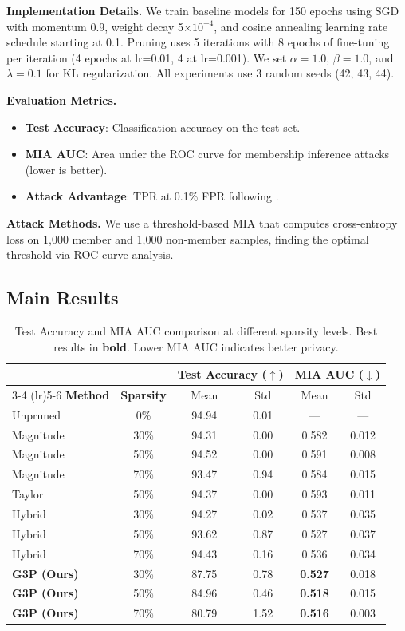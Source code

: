\documentclass[11pt]{article}
\begin{document}
\textbf{Implementation Details.} We train baseline models for 150 epochs using SGD with momentum 0.9, weight decay 5$\times 10^{-4}$, and cosine annealing learning rate schedule starting at 0.1. Pruning uses 5 iterations with 8 epochs of fine-tuning per iteration (4 epochs at lr=0.01, 4 at lr=0.001). We set $\alpha=1.0$, $\beta=1.0$, and $\lambda=0.1$ for KL regularization. All experiments use 3 random seeds (42, 43, 44).

\textbf{Evaluation Metrics.}
\begin{itemize}
    \item \textbf{Test Accuracy}: Classification accuracy on the test set.
    \item \textbf{MIA AUC}: Area under the ROC curve for membership inference attacks (lower is better).
    \item \textbf{Attack Advantage}: TPR at 0.1\% FPR following \citet{carlini2022membership}.
\end{itemize}

\textbf{Attack Methods.} We use a threshold-based MIA that computes cross-entropy loss on 1,000 member and 1,000 non-member samples, finding the optimal threshold via ROC curve analysis.

\subsection{Main Results}

\begin{table}[h]
\caption{Test Accuracy and MIA AUC comparison at different sparsity levels. Best results in \textbf{bold}. Lower MIA AUC indicates better privacy.}
\label{tab:main_results}
\centering
\small
\begin{tabular}{lccccc}
\toprule
& & \multicolumn{2}{c}{\textbf{Test Accuracy ($\uparrow$)}} & \multicolumn{2}{c}{\textbf{MIA AUC ($\downarrow$)}} \\
\cmidrule(lr){3-4} \cmidrule(lr){5-6}
\textbf{Method} & \textbf{Sparsity} & Mean & Std & Mean & Std \\
\midrule
Unpruned & 0\% & 94.94 & 0.01 & --- & --- \\
\midrule
Magnitude & 30\% & 94.31 & 0.00 & 0.582 & 0.012 \\
Magnitude & 50\% & 94.52 & 0.00 & 0.591 & 0.008 \\
Magnitude & 70\% & 93.47 & 0.94 & 0.584 & 0.015 \\
\midrule
Taylor & 50\% & 94.37 & 0.00 & 0.593 & 0.011 \\
\midrule
Hybrid & 30\% & 94.27 & 0.02 & 0.537 & 0.035 \\
Hybrid & 50\% & 93.62 & 0.87 & 0.527 & 0.037 \\
Hybrid & 70\% & 94.43 & 0.16 & 0.536 & 0.034 \\
\midrule
\textbf{G3P (Ours)} & 30\% & 87.75 & 0.78 & \textbf{0.527} & 0.018 \\
\textbf{G3P (Ours)} & 50\% & 84.96 & 0.46 & \textbf{0.518} & 0.015 \\
\textbf{G3P (Ours)} & 70\% & 80.79 & 1.52 & \textbf{0.516} & 0.003 \\
\bottomrule
\end{tabular}
\end{table}
\end{document}

